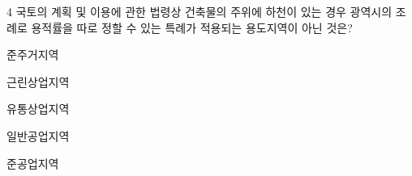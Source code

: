 \begin{question}{4}
국토의 계획 및 이용에 관한 법령상 건축물의 주위에 하천이 있는 경우 광역시의 조례로 용적률을 따로 정할 수 있는 특례가 적용되는 용도지역이 아닌 것은?
\begin{choices}
  \item 준주거지역
  \item 근린상업지역
  \item 유통상업지역
  \item 일반공업지역
  \item 준공업지역
\end{choices}
\end{question}
